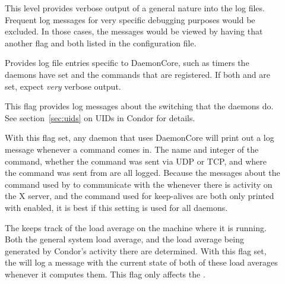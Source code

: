\begin{description}
\begin{description}
  \item[] \label{dflag:fulldebug}
    This level
    provides verbose output of a general nature into the log files.  
    Frequent log messages for very specific debugging
    purposes would be excluded. In those cases, the messages would
    be viewed by having that another flag and  both
    listed in the configuration file.

  \item[] \label{dflag:daemoncore} 
    Provides log
    file entries specific to DaemonCore, such as
    timers the daemons have set and the commands that are registered.
    If both  and  are set,
    expect \emph{very} verbose output.

  \item[] \label{dflag:priv}
    This flag provides log
    messages about the  switching that the daemons
    do.  See section~\ref{sec:uids} on UIDs in Condor for details.

  \item[] \label{dflag:command}
    With this flag set, any
    daemon that uses DaemonCore will print out a log message
    whenever a command comes in.  The name and integer of the command,
    whether the command was sent via UDP or TCP, and where
    the command was sent from are all logged.  
    Because the messages about the command used by  to
    communicate with the  whenever there is activity on
    the X server, and the command used for keep-alives are both only
    printed with  enabled, it is best if this setting
    is used for all daemons.

  \item[] \label{dflag:load}
    The  keeps track
    of the load average on the machine where it is running.  Both the
    general system load average, and the load average being generated by
    Condor's activity there are determined.
    With this flag set, the 
    will log a message with the current state of both of these
    load averages whenever it computes them.  This flag only affects the
    .


\end{description}
\end{description}
